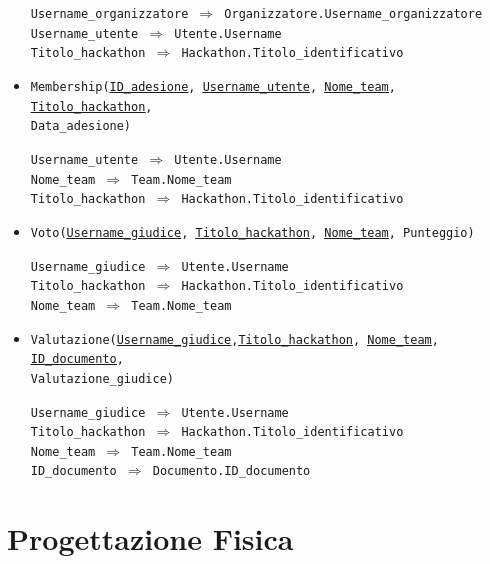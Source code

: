 \documentclass[a4paper, 10pt]{article}
\begin{document}
\begin{itemize}
		\begin{graybox}
			\texttt{Username\_organizzatore $\Rightarrow$ Organizzatore.Username\_organizzatore} \\
			\texttt{Username\_utente $\Rightarrow$ Utente.Username}\\
			\texttt{Titolo\_hackathon $\Rightarrow$ Hackathon.Titolo\_identificativo}
		\end{graybox}
		\item \texttt{Membership(\underline{ID\_adesione}, \underline{\underline{Username\_utente}}, \underline{\underline{Nome\_team}}, \underline{\underline{Titolo\_hackathon}},\\Data\_adesione)}
		\begin{graybox}
			\texttt{Username\_utente $\Rightarrow$ Utente.Username}\\
			\texttt{Nome\_team $\Rightarrow$ Team.Nome\_team}\\
			\texttt{Titolo\_hackathon $\Rightarrow$ Hackathon.Titolo\_identificativo}
		\end{graybox}
		\item \texttt{Voto(\underline{\underline{Username\_giudice}}, \underline{\underline{Titolo\_hackathon}}, \underline{\underline{Nome\_team}}, Punteggio)}
		\begin{graybox}
			\texttt{Username\_giudice $\Rightarrow$ Utente.Username} \\
			\texttt{Titolo\_hackathon $\Rightarrow$ Hackathon.Titolo\_identificativo} \\
			\texttt{Nome\_team $\Rightarrow$ Team.Nome\_team}
		\end{graybox}
		\item \texttt{Valutazione(\underline{\underline{Username\_giudice}},\underline{\underline{Titolo\_hackathon}}, \underline{\underline{Nome\_team}}, \underline{\underline{ID\_documento}},\\Valutazione\_giudice)}
		\begin{graybox}
			\texttt{Username\_giudice $\Rightarrow$ Utente.Username} \\
			\texttt{Titolo\_hackathon $\Rightarrow$ Hackathon.Titolo\_identificativo} \\
			\texttt{Nome\_team $\Rightarrow$ Team.Nome\_team} \\
			\texttt{ID\_documento $\Rightarrow$ Documento.ID\_documento}
		\end{graybox}
	\end{itemize}
	\newpage
	\section{Progettazione Fisica}
\end{document}
